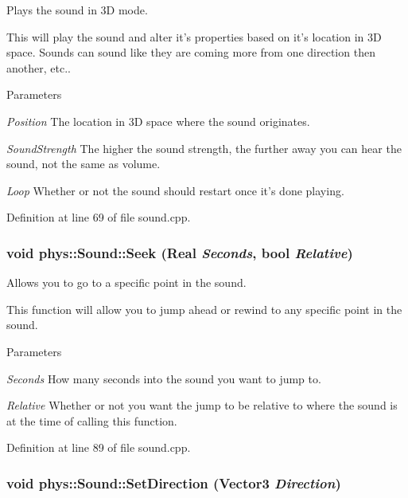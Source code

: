 Plays the sound in 3D mode. 

This will play the sound and alter it's properties based on it's location in 3D space. Sounds can sound like they are coming more from one direction then another, etc.. 
\begin{DoxyParams}{Parameters}
\item[{\em Position}]The location in 3D space where the sound originates. \item[{\em SoundStrength}]The higher the sound strength, the further away you can hear the sound, not the same as volume. \item[{\em Loop}]Whether or not the sound should restart once it's done playing. \end{DoxyParams}


Definition at line 69 of file sound.cpp.

\hypertarget{classphys_1_1Sound_a8dfc3b7e9419a3c50c0ac6ecf6ece096}{
\subsubsection[{Seek}]{\setlength{\rightskip}{0pt plus 5cm}void phys::Sound::Seek ({\bf Real} {\em Seconds}, \/  bool {\em Relative})}}
\label{dc/d2f/classphys_1_1Sound_a8dfc3b7e9419a3c50c0ac6ecf6ece096}


Allows you to go to a specific point in the sound. 

This function will allow you to jump ahead or rewind to any specific point in the sound. 
\begin{DoxyParams}{Parameters}
\item[{\em Seconds}]How many seconds into the sound you want to jump to. \item[{\em Relative}]Whether or not you want the jump to be relative to where the sound is at the time of calling this function. \end{DoxyParams}


Definition at line 89 of file sound.cpp.

\hypertarget{classphys_1_1Sound_af2d6aa7e1b3b2e9f60b8dbbe8aa2d381}{
\subsubsection[{SetDirection}]{\setlength{\rightskip}{0pt plus 5cm}void phys::Sound::SetDirection ({\bf Vector3} {\em Direction})}}
\label{dc/d2f/classphys_1_1Sound_af2d6aa7e1b3b2e9f60b8dbbe8aa2d381}


